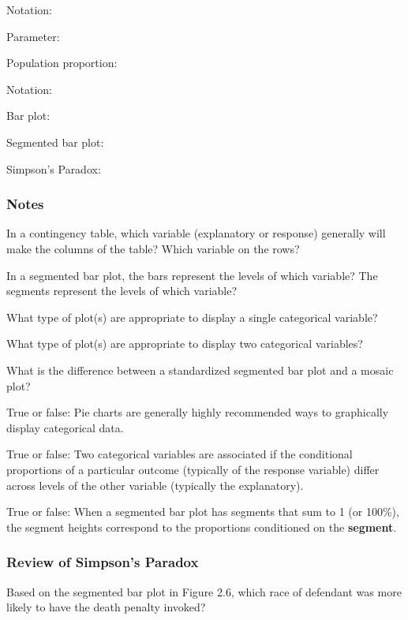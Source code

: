 \documentclass[
]{report}
\newcommand{\rgs}{\vspace{12pt}} %
\newcommand{\rgi}{\hspace{24pt}}  %
\begin{document}
\rgi \rgi Notation:
\rgs

Parameter:
\rgs

\rgi Population proportion:
\rgs

\rgi \rgi Notation:
\rgs

Bar plot:
\rgs

Segmented bar plot:
\rgs

Simpson's Paradox:
\rgs

\hypertarget{notes-4}{%
\subsubsection*{Notes}\label{notes-4}}

In a contingency table, which variable (explanatory or response) generally will make the columns of the table? Which variable on the rows?
\rgs

In a segmented bar plot, the bars represent the levels of which variable? The segments represent the levels of which variable?
\rgs

What type of plot(s) are appropriate to display a single categorical variable?
\rgs

What type of plot(s) are appropriate to display two categorical variables?
\rgs

What is the difference between a standardized segmented bar plot and a mosaic plot?
\rgs

True or false: Pie charts are generally highly recommended ways to graphically display categorical data.

True or false: Two categorical variables are associated if the conditional proportions of a particular outcome (typically of the response variable) differ across levels of the other variable (typically the explanatory).

True or false: When a segmented bar plot has segments that sum to 1 (or 100\%), the segment heights correspond to the proportions conditioned on the \textbf{segment}.

\hypertarget{review-of-simpsons-paradox}{%
\subsubsection*{Review of Simpson's Paradox}\label{review-of-simpsons-paradox}}

Based on the segmented bar plot in Figure 2.6, which race of defendant was more likely to have the death penalty invoked?
\rgs
\end{document}
